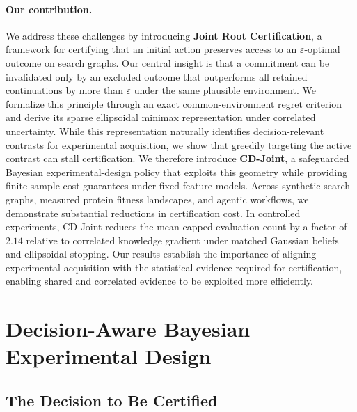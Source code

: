 \documentclass{article}
\theoremstyle{plain}
\theoremstyle{definition}
\begin{document}
\paragraph{Our contribution.}
We address these challenges by introducing
\textbf{Joint Root Certification}, a framework for certifying
that an initial action preserves access to an $\varepsilon$-optimal
outcome on search graphs. Our central insight is that a commitment
can be invalidated only by an excluded outcome that outperforms
all retained continuations by more than $\varepsilon$ under the
same plausible environment. We formalize this principle through
an exact common-environment regret criterion and derive its sparse
ellipsoidal minimax representation under correlated uncertainty.
While this representation naturally identifies decision-relevant
contrasts for experimental acquisition, we show that greedily
targeting the active contrast can stall certification.
We therefore introduce \textbf{CD-Joint}, a safeguarded Bayesian
experimental-design policy that exploits this geometry while
providing finite-sample cost guarantees under fixed-feature models.
Across synthetic search graphs, measured protein fitness landscapes,
and agentic workflows, we demonstrate substantial reductions in
certification cost. In controlled experiments, CD-Joint reduces
the mean capped evaluation count by a factor of $2.14$ relative
to correlated knowledge gradient under matched Gaussian beliefs
and ellipsoidal stopping. Our results establish the importance
of aligning experimental acquisition with the statistical
evidence required for certification, enabling shared and
correlated evidence to be exploited more efficiently.





\section{Decision-Aware Bayesian Experimental Design}
\label{sec:method}

\subsection{The Decision to Be Certified}
\label{sec:model}\label{sec:model-dag}\label{sec:model-certification}
\label{sec:model-monitors}\label{sec:shared-regret}
\label{sec:selective-theory}\label{sec:theory-backup}
\end{document}
